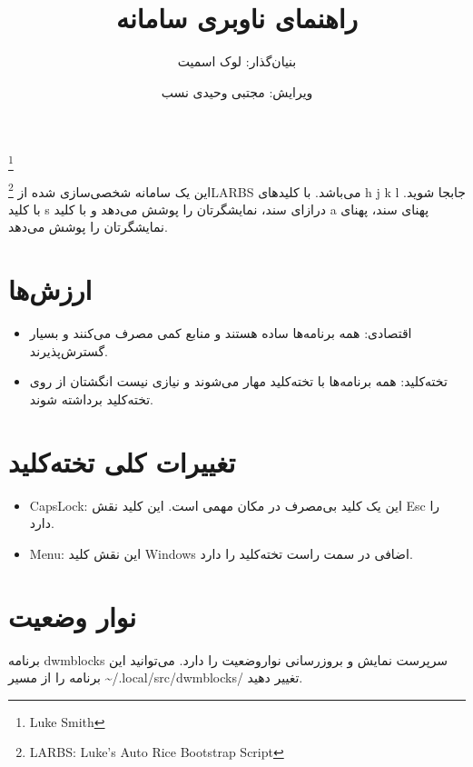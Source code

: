 \documentclass{article}
\title{راهنمای ناوبری سامانه}
\author{بنیان‌گذار: لوک اسمیت}
\date{ویرایش: مجتبی وحیدی نسب}
\renewcommand{\maketitle}{
	\begin{center}
		{\huge\thetitle}

		{\footnote{\raggedright\textenglish{Luke Smith}}{\theauthor}\hspace{2cm}\thedate}
	\end{center}
}
\begin{document}
\maketitle
این یک سامانه شخصی‌سازی شده از \footnote{\raggedright\textenglish{LARBS: Luke's Auto Rice Bootstrap Script}}{LARBS} می‌باشد. با کلیدهای \textenglish{h j k l} جابجا شوید. با کلید s درازای سند، نمایشگرتان را پوشش می‌دهد و با کلید a پهنای سند، پهنای نمایشگرتان را پوشش می‌دهد.
\section{ارزش‌‌ها}
\begin{itemize}
	\item اقتصادی: همه برنامه‌ها ساده هستند و منابع کمی مصرف می‌کنند و بسیار گسترش‌پذیرند.
	\item تخته‌کلید: همه برنامه‌ها با تخته‌کلید مهار می‌شوند و نیازی نیست انگشتان از روی تخته‌کلید برداشته شوند.
\end{itemize}
\section{تغییرات کلی تخته‌کلید}
\begin{itemize}
	\item \textenglish{CapsLock}: این یک کلید بی‌مصرف در مکان مهمی است. این کلید نقش Esc را دارد.
	\item \textenglish{Menu}: این نقش کلید Windows اضافی در سمت راست تخته‌کلید را دارد.
\end{itemize}
\section{نوار وضعیت}
\indent{}

برنامه dwmblocks سرپرست نمایش و بروزرسانی نواروضعیت را دارد. می‌توانید این برنامه را از مسیر \textenglish{\textasciitilde/.local/src/dwmblocks/} تغییر دهید.
\end{document}
